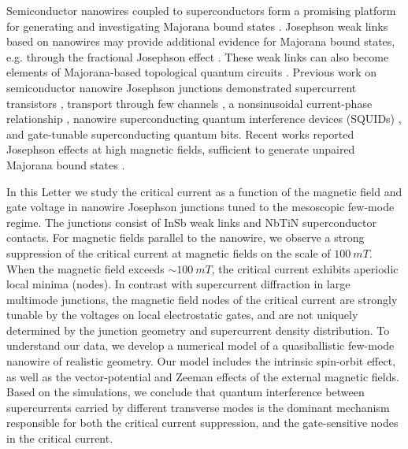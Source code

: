 \documentclass[english, twocolumn, 10pt, aps, superscriptaddress, floatfix, showpacs, prb, citeautoscript]{revtex4-1}
\begin{document}
\maketitle

Semiconductor nanowires coupled to superconductors form a promising platform for generating and investigating Majorana bound states \cite{kitaev2001unpaired, oreg2010helical, lutchyn2010majorana,mourik2012signatures, deng2016majorana, albrecht2016exponential,chen2016phasediagram}. 
Josephson weak links based on nanowires may provide additional evidence for Majorana bound states, e.g. through the fractional Josephson effect \cite{molenkamp2016abs4pi,bocquillon2016gapless,Deacon2016josephsonradiation}. 
These weak links can also become elements of Majorana-based topological quantum circuits \cite{Hyart2013braiding, Aasen2016briading, Karzig2016braiding, plugge2016majorana}.
Previous work on semiconductor nanowire Josephson junctions demonstrated supercurrent transistors \cite{doh2005tunable}, transport through few channels \cite{goffman2017conduction}, a nonsinusoidal current-phase relationship \cite{spanton2017current}, nanowire superconducting quantum interference devices (SQUIDs) \cite{vanDam2006supercurrent, szombati2015josephson}, and gate-tunable superconducting quantum bits\cite{deLange2015hyrbidnanowire,marcus2015hyrbidnanowire}.
Recent works reported Josephson effects at high magnetic fields, sufficient to generate unpaired Majorana bound states \cite{szombati2015josephson,giazaotto2015pbinas,giazotto2016magnetically,gharavi2016nb}.

In this Letter we study the critical current as a function of the magnetic field and gate voltage in nanowire Josephson junctions tuned to the mesoscopic few-mode regime.
The junctions consist of InSb weak links and NbTiN superconductor contacts.
For magnetic fields parallel to the nanowire, we observe a strong suppression of the critical current at magnetic fields on the scale of $\SI{100}{mT}$. 
When the magnetic field exceeds $\sim \SI{100}{mT}$, the critical current exhibits aperiodic local minima (nodes). 
In contrast with supercurrent diffraction in large multimode junctions, the magnetic field nodes of the critical current are strongly tunable by the voltages on local electrostatic gates, and are not uniquely determined by the junction geometry and supercurrent density distribution. 
To understand our data, we develop a numerical model of a quasiballistic few-mode nanowire of realistic geometry.
Our model includes the intrinsic spin-orbit effect, as well as the vector-potential and Zeeman effects of the external magnetic fields. 
Based on the simulations, we conclude that quantum interference between supercurrents carried by different transverse modes is the dominant mechanism responsible for both the critical current suppression, and the gate-sensitive nodes in the critical current.
\end{document}
